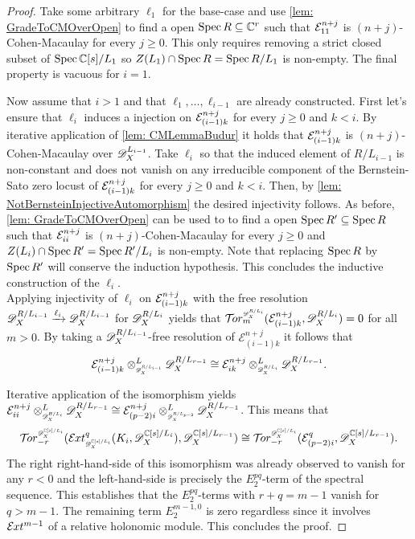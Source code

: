 \begin{proof}
  Take some arbitrary $\ell_1$ for the base-case and use \cref{lem: GradeToCMOverOpen} to find a open $\operatorname{Spec} R \subseteq \mathbb{C}^r$ such that $\mathcal{E}^{n+j}_{11}$  is $(n+j)$-Cohen-Macaulay for every $j\geq 0$.
  This only requires removing a strict closed subset of $\operatorname{Spec} \mathbb{C}[s]/L_1$ so $Z(L_1)\cap \operatorname{Spec} R = \operatorname{Spec} R/L_1$ is non-empty.
  The final property is vacuous for $i=1$.

  Now assume that $i>1$ and that $\ell_1,\ldots, \ell_{i-1}$ are already constructed.
  First let's ensure that $\ell_i$
  induces a injection on $\mathcal{E}^{n+j}_{(i-1)k}$ for every $j\geq 0$ and $k<i$.
  By iterative application of \cref{lem: CMLemmaBudur} it holds that $\mathcal{E}^{n+j}_{(i-1)k }$
  is $(n+j)$-Cohen-Macaulay over $\mathscr{D}_X^{L_{i-1}}$.
  Take $\ell_i$ so that the induced element of $R/L_{i-1}$ is non-constant and does not vanish on any irreducible component of the Bernstein-Sato zero locust of $\mathcal{E}^{n+j}_{(i-1)k}$ for every $j\geq 0$ and $k<i$.
  Then, by \cref{lem: NotBernsteinInjectiveAutomorphism} the desired injectivity follows.
  As before, \cref{lem: GradeToCMOverOpen} can be used to to find a open $\operatorname{Spec} R' \subseteq \operatorname{Spec} R$ such that $\mathcal{E}^{n+j}_{ii}$  is $(n+j)$-Cohen-Macaulay for every $j\geq 0$ and  $Z(L_i)\cap \operatorname{Spec} R' = \operatorname{Spec} R'/L_i$ is non-empty.
  Note that replacing $\operatorname{Spec} R$ by $\operatorname{Spec} R'$ will conserve the induction hypothesis.
  This concludes the inductive construction of the $\ell_i$.\\


  Applying injectivity of $\ell_i$ on $\mathcal{E}_{(i-1)k}^{n+j}$ with the free resolution $\mathscr{D}_X^{R/L_{i-1}}\xrightarrow{\ell_i}\mathscr{D}_X^{R/L_{i-1}}$ for $\mathscr{D}_X^{R/L_i}$ yields that $\Tr{\D_\X^{R/L_i}}{m}(\E_{(i-1)k}^{n+j}, \D_\X^{R/L_i}) = 0$ for all $m>0$.
  By taking a $\mathscr{D}_X^{R/L_{i-1}}$-free resolution of $\mathcal{E}_{(i-1)k}^{n+j}$ it follows that
  $$\mathcal{E}_{(i-1)k}^{n+j} \otimes^L_{\scaleto{\D_\X^{R/L_{i-1}}}{8pt}} \D_\X^{R/L_{r-1}} \cong  \mathcal{E}_{ik}^{n+j}  \otimes^L_{\scaleto{\D_\X^{R/L_{i}}}{8pt}}\D_\X^{R/L_{r-1}}. $$


  Iterative application of the isomorphism yields $\E_{ii}^{n+j}\otimes^L_{\scaleto{\D_\X^{R/L_{i}}}{8pt}} \D_\X^{R/L_{r-1}} \cong \E_{(p-2)i}^{n+j}\otimes^L_{\scaleto{\D_\X^{R/L_{p-2}}}{8pt}} \D_\X^{R/L_{r-1}}$.
  This means that
  $$\Tr{\D_\X^{\C[s]/L_{i}}}{-r} (\Ex{\D_\X^{\C[s]/L_{i}} }{q} (K_i,\D_\X^{\C[s]/L_{i}}), \D_\X^{\C[s]/L_{r-1}})\cong \Tr{\D_\X^{\C[s]/L_{i}} }{-r}(\E_{(p-2)i}^{q}, \D_\X^{\C[s]/L_{r-1}}).$$
  The right right-hand-side of this isomorphism was already observed to vanish for any $r < 0$ and the left-hand-side is precisely the $E^{pq}_2$-term of the spectral sequence.
  This establishes that the $E^{pq}_2$-terms with $r+q = m -1$ vanish for $q>m-1$.
  The remaining term $E^{m -1,0}_2$ is zero regardless since it involves $\mathcal{E}\mkern -1mu xt^{m - 1}$ of a relative holonomic module.
  This concludes the proof.
\end{proof}

